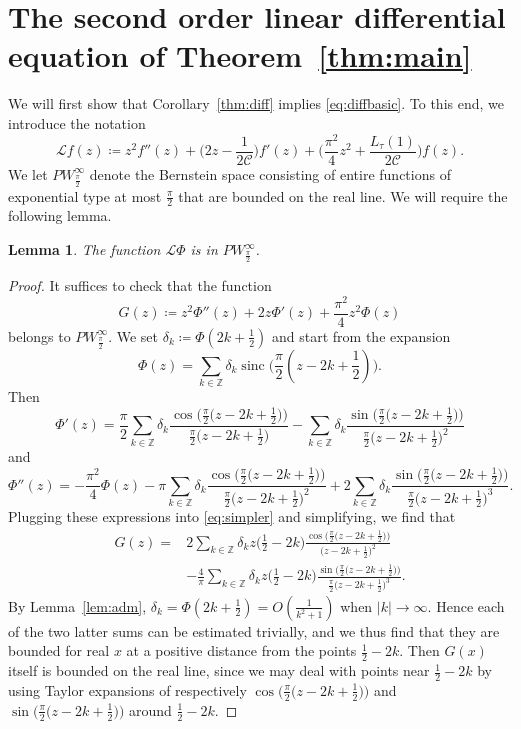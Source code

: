 \documentclass[12pt]{amsart}
\theoremstyle{plain}
\newtheorem{lemma}[theorem]{Lemma}
\numberwithin{equation}{section}
\theoremstyle{definition}
\DeclareMathOperator{\sinc}{sinc}
\newcommand{\Cone}{\mathscr{C}}
\begin{document}
\section{The second order linear differential equation of Theorem~\ref{thm:main}}
\label{sec:ode}
We will first show that Corollary~\ref{thm:diff} implies \eqref{eq:diffbasic}. To this end, we introduce the notation
\[ \mathcal{L}f(z)\coloneqq z^2f''(z) + \Big(2z-\frac{1}{2\Cone}\Big)f'(z) + \Big(\frac{\pi^2}{4}z^2+\frac{L_{\tau}(1)}{2\Cone}\Big)f(z). \]
We let $PW_{\frac{\pi}{2}}^\infty$ denote the Bernstein space consisting of entire functions of exponential type at most $\frac{\pi}{2}$ that are bounded on the real line. We will require the following lemma.
\begin{lemma}\label{lem:Bernstein}
The function $\mathcal{L}\Phi$ is in $PW_{\frac{\pi}{2}}^\infty$.
\end{lemma}
\begin{proof}It suffices to check that the function
\begin{equation} \label{eq:simpler} G(z)\coloneqq z^2\Phi''(z) + 2z\Phi'(z) + \frac{\pi^2}{4}z^2\Phi(z) \end{equation}
belongs to $PW_{\frac{\pi}{2}}^\infty$. We set $\delta_k\coloneqq \Phi(2k+\frac12)$ and start from the expansion
\[ \Phi(z)=\sum_{k\in \mathbb{Z}} \delta_k  \sinc \big(\frac{\pi}{2}(z-2k+\frac12)\big).	 \]
Then
\[ \Phi'(z)=\frac{\pi}{2} \sum_{k\in \mathbb{Z}}\delta_k \frac{\cos\big(\frac{\pi}{2}\big(z-2k+\frac12\big)\big)}{\frac{\pi}{2}\big(z-2k+\frac12\big)}-\sum_{k\in \mathbb{Z}}\delta_k \frac{\sin\big(\frac{\pi}{2}\big(z-2k+\frac12\big)\big)}{\frac{\pi}{2}\big(z-2k+\frac12\big)^2}  \]
and
\[ \Phi''(z)=-\frac{\pi^2}{4} \Phi(z)-\pi \sum_{k\in \mathbb{Z}}\delta_k \frac{\cos\big(\frac{\pi}{2}\big(z-2k+\frac12\big)\big)}{\frac{\pi}{2}\big(z-2k+\frac12\big)^2}+2\sum_{k\in \mathbb{Z}}\delta_k \frac{\sin\big(\frac{\pi}{2}\big(z-2k+\frac12\big)\big)}{\frac{\pi}{2}\big(z-2k+\frac12\big)^3} . \]
Plugging these expressions into \eqref{eq:simpler} and simplifying, we find that
\begin{align*} G(z)= & 2 \sum_{k\in \mathbb{Z}}\delta_k z\big(\frac12-2k\big)\frac{\cos\big(\frac{\pi}{2}\big(z-2k+\frac12\big)\big)}{\big(z-2k+\frac12\big)^2} \\
& -\frac{4}{\pi}
\sum_{k\in \mathbb{Z}}\delta_k z\big(\frac12-2k\big)\frac{\sin\big(\frac{\pi}{2}\big(z-2k+\frac12\big)\big)}{\frac{\pi}{2}\big(z-2k+\frac12\big)^3}.  \end{align*}
By Lemma~\ref{lem:adm}, $\delta_k=\Phi(2k+\frac12)=O(\frac{1}{k^2+1})$ when $|k|\to \infty$. Hence each of the two latter sums can be estimated trivially, and we thus find that they are bounded for real $x$ at a positive distance from the points $\frac12-2k$. Then $G(x)$ itself is bounded on the real line, since we may deal with points near $\frac12-2k$ by using Taylor expansions of respectively
$\cos\big(\frac{\pi}{2}\big(z-2k+\frac12\big)\big)$ and $\sin\big(\frac{\pi}{2}\big(z-2k+\frac12\big)\big)$ around $\frac12-2k$.
 \end{proof}
\end{document}
